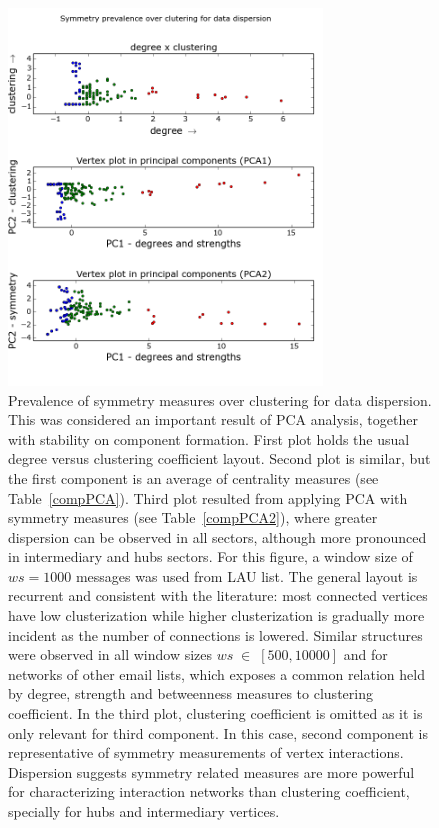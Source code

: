 \documentclass[%
 aip,
 jmp,%
 amsmath,amssymb,
 reprint,%
]{revtex4-1}
\begin{document}
\begin{figure} 
   \centering
        \includegraphics[width=.6\textwidth,height=10cm]{figs/im13PCAPLOT}
	\caption{Prevalence of symmetry measures over clustering for data dispersion. This was considered an important result of PCA analysis, together with stability on component formation. First plot holds the usual degree versus clustering coefficient layout. Second plot is similar, but the first component is an average of centrality measures (see Table~\ref{compPCA}). Third plot resulted from applying PCA with symmetry measures (see Table~\ref{compPCA2}), where greater dispersion can be observed in all sectors, although more pronounced in intermediary and hubs sectors.
    For this figure, a window size of $ws = 1000$ messages was used from LAU list. The general layout is recurrent and consistent with the literature: most connected vertices have low clusterization while higher clusterization is gradually more incident as the number of connections is lowered.
Similar structures were observed in all window sizes $ws\;\in\;[500,10000]$ and for networks of other email lists, which exposes a common relation held by degree, strength and betweenness measures to clustering coefficient.
    In the third plot, clustering coefficient is omitted as it is only relevant for third component. In this case, second component is representative of symmetry measurements of vertex interactions. Dispersion suggests symmetry related measures are more powerful for characterizing interaction networks than clustering coefficient, specially for hubs and intermediary vertices.
    }
    \label{fig:sym}
\end{figure}
\end{document}

